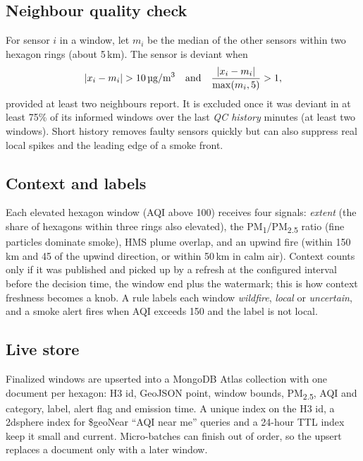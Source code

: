 \documentclass[10pt,journal,compsoc]{IEEEtran}
\newcommand{\ugm}{\,\textmu g/m\textsuperscript{3}}
\begin{document}
\subsection{Neighbour quality check}
For sensor $i$ in a window, let $m_i$ be the median of the other sensors within two hexagon rings (about 5\,km). The sensor is deviant when
\begin{equation}
|x_i - m_i| > 10\text{\ugm} \quad\text{and}\quad \frac{|x_i - m_i|}{\max(m_i, 5)} > 1,
\end{equation}
provided at least two neighbours report. It is excluded once it was deviant in at least 75\% of its informed windows over the last \emph{QC history} minutes (at least two windows). Short history removes faulty sensors quickly but can also suppress real local spikes and the leading edge of a smoke front.

\subsection{Context and labels}
Each elevated hexagon window (AQI above 100) receives four signals: \emph{extent} (the share of hexagons within three rings also elevated), the PM\textsubscript{1}/PM\textsubscript{2.5} ratio (fine particles dominate smoke), HMS plume overlap, and an upwind fire (within 150\,km and 45\textdegree{} of the upwind direction, or within 50\,km in calm air). Context counts only if it was published and picked up by a refresh at the configured interval before the decision time, the window end plus the watermark; this is how context freshness becomes a knob. A rule labels each window \emph{wildfire}, \emph{local} or \emph{uncertain}, and a smoke alert fires when AQI exceeds 150 and the label is not local.

\subsection{Live store}
Finalized windows are upserted into a MongoDB Atlas collection with one document per hexagon: H3 id, GeoJSON point, window bounds, PM\textsubscript{2.5}, AQI and category, label, alert flag and emission time. A unique index on the H3 id, a 2dsphere index for \$geoNear ``AQI near me'' queries and a 24-hour TTL index keep it small and current. Micro-batches can finish out of order, so the upsert replaces a document only with a later window.
\end{document}

